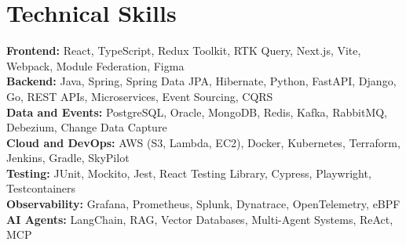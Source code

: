 \documentclass[a4paper,10pt]{article}
\begin{document}
\section{Technical Skills}
{\small
    \textbf{Frontend:} React, TypeScript, Redux Toolkit, RTK Query, Next.js, Vite, Webpack, Module Federation, Figma \\
    \textbf{Backend:} Java, Spring, Spring Data JPA, Hibernate, Python, FastAPI, Django, Go, REST APIs, Microservices, Event Sourcing, CQRS \\
    \textbf{Data and Events:} PostgreSQL, Oracle, MongoDB, Redis, Kafka, RabbitMQ, Debezium, Change Data Capture \\
    \textbf{Cloud and DevOps:} AWS (S3, Lambda, EC2), Docker, Kubernetes, Terraform, Jenkins, Gradle, SkyPilot \\
    \textbf{Testing:} JUnit, Mockito, Jest, React Testing Library, Cypress, Playwright, Testcontainers \\
    \textbf{Observability:} Grafana, Prometheus, Splunk, Dynatrace, OpenTelemetry, eBPF \\
    \textbf{AI Agents:} LangChain, RAG, Vector Databases, Multi-Agent Systems, ReAct, MCP \\
}
\end{document}
